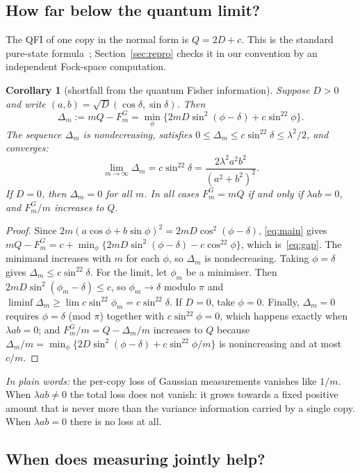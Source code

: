 \documentclass[11pt,a4paper]{article}
\newtheorem{corollary}{Corollary}
\theoremstyle{definition}\newtheorem{definition}{Definition}
\theoremstyle{remark}\newtheorem{remark}{Remark}
\newcommand{\takeaway}[1]{\par\smallskip\noindent\textit{In plain words:} #1\par\smallskip}
\begin{document}
\subsection{How far below the quantum limit?}

The QFI of one copy in the normal form is $Q=2D+c$. This is the standard pure-state formula~\cite{Monras2013}; Section~\ref{sec:repro} checks it in our convention by an independent Fock-space computation.

\begin{corollary}[shortfall from the quantum Fisher information]\label{cor:gap}
Suppose $D>0$ and write $(a,b)=\sqrt D(\cos\delta,\sin\delta)$. Then
\begin{equation}\label{eq:gap}
\Delta_m:=mQ-F_m^G=\min_{\phi}\big\{2mD\sin^2(\phi-\delta)+c\sin^22\phi\big\}.
\end{equation}
The sequence $\Delta_m$ is nondecreasing, satisfies $0\le\Delta_m\le c\sin^22\delta\le\lambda^2/2$, and converges:
\[
\lim_{m\to\infty}\Delta_m=c\sin^22\delta=\frac{2\lambda^2a^2b^2}{(a^2+b^2)^2}.
\]
If $D=0$, then $\Delta_m=0$ for all $m$. In all cases $F_m^G=mQ$ if and only if $\lambda ab=0$, and $F_m^G/m$ increases to $Q$.
\end{corollary}

\begin{proof}
Since $2m(a\cos\phi+b\sin\phi)^2=2mD\cos^2(\phi-\delta)$, \eqref{eq:main} gives $mQ-F_m^G=c+\min_\phi\{2mD\sin^2(\phi-\delta)-c\cos^22\phi\}$, which is~\eqref{eq:gap}. The minimand increases with $m$ for each $\phi$, so $\Delta_m$ is nondecreasing. Taking $\phi=\delta$ gives $\Delta_m\le c\sin^22\delta$. For the limit, let $\phi_m$ be a minimiser. Then $2mD\sin^2(\phi_m-\delta)\le c$, so $\phi_m\to\delta$ modulo $\pi$ and $\liminf\Delta_m\ge\lim c\sin^22\phi_m=c\sin^22\delta$. If $D=0$, take $\phi=0$. Finally, $\Delta_m=0$ requires $\phi=\delta$ (mod $\pi$) together with $c\sin^22\phi=0$, which happens exactly when $\lambda ab=0$; and $F_m^G/m=Q-\Delta_m/m$ increases to $Q$ because $\Delta_m/m=\min_\phi\{2D\sin^2(\phi-\delta)+c\sin^22\phi/m\}$ is nonincreasing and at most $c/m$.
\end{proof}

\takeaway{the per-copy loss of Gaussian measurements vanishes like $1/m$. When $\lambda ab\ne0$ the total loss does not vanish: it grows towards a fixed positive amount that is never more than the variance information carried by a single copy. When $\lambda ab=0$ there is no loss at all.}

\subsection{When does measuring jointly help?}
\end{document}
